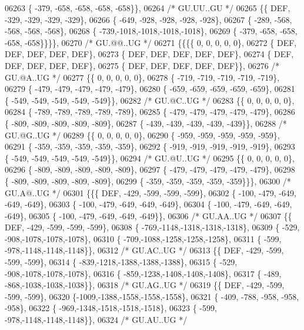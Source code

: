 \begin{DoxyCode}
06263 \{ -379, -658, -658, -658, -658\}\},
06264 \textcolor{comment}{/* GU.UU..GU */}
06265 \{\{  DEF, -329, -329, -329, -329\},
06266 \{ -649, -928, -928, -928, -928\},
06267 \{ -289, -568, -568, -568, -568\},
06268 \{ -739,-1018,-1018,-1018,-1018\},
06269 \{ -379, -658, -658, -658, -658\}\}\}\},
06270 \textcolor{comment}{/* GU.@@..UG */}
06271 \{\{\{\{    0,    0,    0,    0,    0\},
06272 \{  DEF,  DEF,  DEF,  DEF,  DEF\},
06273 \{  DEF,  DEF,  DEF,  DEF,  DEF\},
06274 \{  DEF,  DEF,  DEF,  DEF,  DEF\},
06275 \{  DEF,  DEF,  DEF,  DEF,  DEF\}\},
06276 \textcolor{comment}{/* GU.@A..UG */}
06277 \{\{    0,    0,    0,    0,    0\},
06278 \{ -719, -719, -719, -719, -719\},
06279 \{ -479, -479, -479, -479, -479\},
06280 \{ -659, -659, -659, -659, -659\},
06281 \{ -549, -549, -549, -549, -549\}\},
06282 \textcolor{comment}{/* GU.@C..UG */}
06283 \{\{    0,    0,    0,    0,    0\},
06284 \{ -789, -789, -789, -789, -789\},
06285 \{ -479, -479, -479, -479, -479\},
06286 \{ -809, -809, -809, -809, -809\},
06287 \{ -439, -439, -439, -439, -439\}\},
06288 \textcolor{comment}{/* GU.@G..UG */}
06289 \{\{    0,    0,    0,    0,    0\},
06290 \{ -959, -959, -959, -959, -959\},
06291 \{ -359, -359, -359, -359, -359\},
06292 \{ -919, -919, -919, -919, -919\},
06293 \{ -549, -549, -549, -549, -549\}\},
06294 \textcolor{comment}{/* GU.@U..UG */}
06295 \{\{    0,    0,    0,    0,    0\},
06296 \{ -809, -809, -809, -809, -809\},
06297 \{ -479, -479, -479, -479, -479\},
06298 \{ -809, -809, -809, -809, -809\},
06299 \{ -359, -359, -359, -359, -359\}\}\},
06300 \textcolor{comment}{/* GU.A@..UG */}
06301 \{\{\{  DEF, -429, -599, -599, -599\},
06302 \{ -100, -479, -649, -649, -649\},
06303 \{ -100, -479, -649, -649, -649\},
06304 \{ -100, -479, -649, -649, -649\},
06305 \{ -100, -479, -649, -649, -649\}\},
06306 \textcolor{comment}{/* GU.AA..UG */}
06307 \{\{  DEF, -429, -599, -599, -599\},
06308 \{ -769,-1148,-1318,-1318,-1318\},
06309 \{ -529, -908,-1078,-1078,-1078\},
06310 \{ -709,-1088,-1258,-1258,-1258\},
06311 \{ -599, -978,-1148,-1148,-1148\}\},
06312 \textcolor{comment}{/* GU.AC..UG */}
06313 \{\{  DEF, -429, -599, -599, -599\},
06314 \{ -839,-1218,-1388,-1388,-1388\},
06315 \{ -529, -908,-1078,-1078,-1078\},
06316 \{ -859,-1238,-1408,-1408,-1408\},
06317 \{ -489, -868,-1038,-1038,-1038\}\},
06318 \textcolor{comment}{/* GU.AG..UG */}
06319 \{\{  DEF, -429, -599, -599, -599\},
06320 \{-1009,-1388,-1558,-1558,-1558\},
06321 \{ -409, -788, -958, -958, -958\},
06322 \{ -969,-1348,-1518,-1518,-1518\},
06323 \{ -599, -978,-1148,-1148,-1148\}\},
06324 \textcolor{comment}{/* GU.AU..UG */}

\end{DoxyCode}
